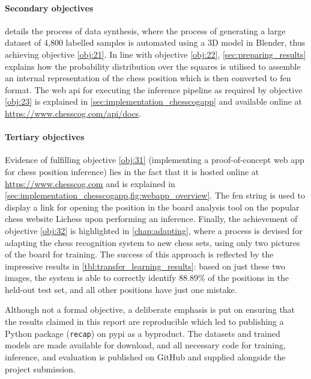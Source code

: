 \documentclass[../report.tex]{subfiles}
\begin{document}
\paragraph{Secondary objectives}
 details the process of data synthesis, where the process of generating a large dataset of 4,800 labelled samples is automated using a 3D model in Blender, thus achieving objective \ref{obj:21}.
In line with objective \ref{obj:22}, \cref{sec:preparing_results} explains how the probability distribution over the squares is utilised to assemble an internal representation of the chess position which is then converted to \gls{fen} format.
The web \gls{api} for executing the inference pipeline as required by objective \ref{obj:23} is explained in \cref{sec:implementation_chesscogapp} and available online at \url{https://www.chesscog.com/api/docs}.

\paragraph{Tertiary objectives}
Evidence of fulfilling objective \ref{obj:31} (implementing a proof-of-concept web app for chess position inference) lies in the fact that it is hosted online at \url{https://www.chesscog.com} and is explained in \cref{sec:implementation_chesscogapp,fig:webapp_overview}.
The \gls{fen} string is used to display a link for opening the position in the board analysis tool on the popular chess website Lichess upon performing an inference.
Finally, the achievement of objective \ref{obj:32} is highlighted in \cref{chap:adapting}, where a process is devised for adapting the chess recognition system to new chess sets, using only two pictures of the board for training.
The success of this approach is reflected by the impressive results in \cref{tbl:transfer_learning_results}: based on just these two images, the system is able to correctly identify 88.89\% of the positions in the held-out test set, and all other positions have just one mistake.

Although not a formal objective, a deliberate emphasis is put on ensuring that the results claimed in this report are reproducible which led to publishing a Python package (\texttt{recap}) on \gls{pypi} as a byproduct.
The datasets and trained models are made available for download, and all necessary code for training, inference, and evaluation is published on GitHub and supplied alongside the project submission.
\end{document}
